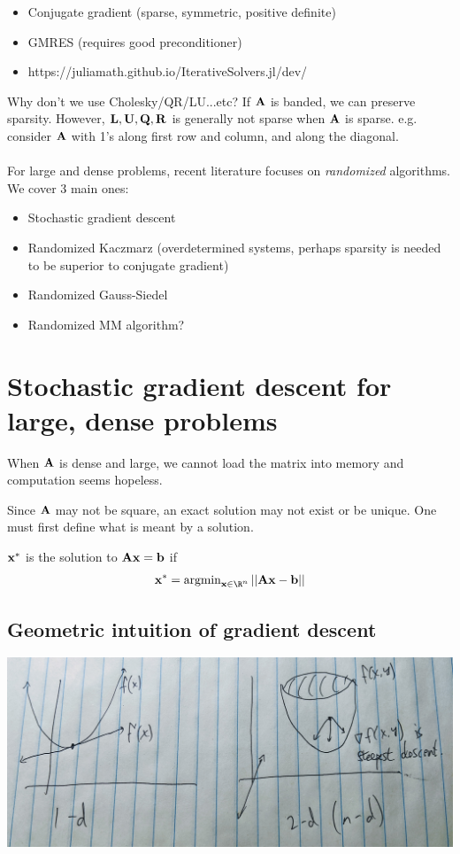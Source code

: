 \documentclass[./some_latex_template.tex]{subfiles}
\begin{document}
\begin{itemize}
	\item Conjugate gradient (sparse, symmetric, positive definite)
	\item GMRES (requires good preconditioner)
	\item https://juliamath.github.io/IterativeSolvers.jl/dev/
\end{itemize}

Why don't we use Cholesky/QR/LU...etc? If $\mathbf{A}$ is banded, we can preserve sparsity. However, $\mathbf{L}, \mathbf{U}, \mathbf{Q}, \mathbf{R}$ is generally not sparse when $\mathbf{A}$ is sparse. e.g. consider $\mathbf{A}$ with 1's along first row and column, and along the diagonal. \\
\\
For large and dense problems, recent literature focuses on \textit{randomized} algorithms. We cover 3 main ones:
\begin{itemize}
	\item Stochastic gradient descent
	\item Randomized Kaczmarz (overdetermined systems, perhaps sparsity is needed to be superior to conjugate gradient)
	\item Randomized Gauss-Siedel
	\item Randomized MM algorithm?
\end{itemize}

\section{Stochastic gradient descent for large, dense problems}

When $\mathbf{A}$ is dense and large, we cannot load the matrix into memory and computation seems hopeless. 

Since $\mathbf{A}$ may not be square, an exact solution may not exist or be unique. One must first define what is meant by a solution. 
\begin{definition}
$\mathbf{x}^*$ is the solution to $\mathbf{A} \mathbf{x} = \mathbf{b}$ if 
\begin{align*}
	\bx^* = \argmin_{\bx \in \R^n} ||\bA\bx - \bb||
\end{align*}
\end{definition}

\subsection{Geometric intuition of gradient descent}

\begin{center}
	\includegraphics[scale=0.1]{gradient_illustration.jpg}
\end{center}
\end{document}
